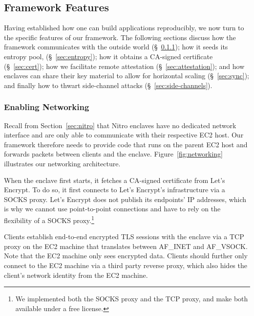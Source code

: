 \subsection{Framework Features}
\label{sec:framework}

Having established how one can build applications reproducibly, we now turn to
the specific features of our framework.  The following sections discuss how the
framework communicates with the outside world (\S~\ref{sec:networking});
how it seeds its entropy pool, (\S~\ref{sec:entropy});
how it obtains a CA-signed certificate (\S~\ref{sec:cert});
how we facilitate remote attestation (\S~\ref{sec:attestation});
and how enclaves can share their key material to allow for horizontal scaling (\S~\ref{sec:sync});
and finally how to thwart side-channel attacks (\S~\ref{sec:side-channels}).


\subsubsection{Enabling Networking}
\label{sec:networking}

Recall from Section~\ref{sec:nitro} that Nitro enclaves have no dedicated
network interface and are only able to communicate with their respective EC2
host.  Our framework therefore needs to provide code that runs on the parent
EC2 host and forwards packets between clients and the enclave.
Figure~\ref{fig:networking} illustrates our networking architecture.

When the enclave first starts, it fetches a CA-signed certificate from Let's
Encrypt.  To do so, it first connects to Let's Encrypt's infrastructure via a
SOCKS proxy.  Let's Encrypt does not publish its endpoints' IP addresses, which
is why we cannot use point-to-point connections and have to rely on the
flexibility of a SOCKS proxy.\footnote{We implemented both the SOCKS proxy and
the TCP proxy, and make both available under a free license.}

Clients establish end-to-end encrypted TLS sessions with the enclave via a TCP
proxy on the EC2 machine that translates between AF\_INET and AF\_VSOCK.  Note
that the EC2 machine only sees encrypted data. Clients should further only
connect to the EC2 machine via a third party reverse proxy, which also hides
the client's network identity from the EC2 machine.

